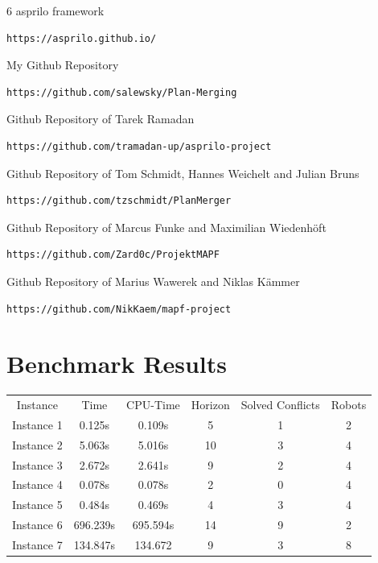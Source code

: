 \documentclass[runningheads]{llncs}
\begin{document}
\begin{thebibliography} {6}
asprilo framework
\begin{verbatim}
https://asprilo.github.io/
\end{verbatim}

My Github Repository
\begin{verbatim}
https://github.com/salewsky/Plan-Merging
\end{verbatim}

Github Repository of Tarek Ramadan
\begin{verbatim}
https://github.com/tramadan-up/asprilo-project
\end{verbatim}

Github Repository of Tom Schmidt, Hannes Weichelt and Julian Bruns
\begin{verbatim}
https://github.com/tzschmidt/PlanMerger
\end{verbatim}

Github Repository of Marcus Funke and Maximilian Wiedenhöft
\begin{verbatim}
https://github.com/Zard0c/ProjektMAPF
\end{verbatim}

Github Repository of Marius Wawerek and Niklas Kämmer
\begin{verbatim}
https://github.com/NikKaem/mapf-project
\end{verbatim}

\end{thebibliography}

\newpage
\appendix
\section{Benchmark Results}
\begin{tabular}[h]{c|c|c|c|c|c}
Instance & Time & CPU-Time & Horizon & Solved Conflicts & Robots \\
Instance 1 & 0.125s & 0.109s & 5 & 1 & 2 \\
Instance 2 & 5.063s & 5.016s & 10 & 3 & 4 \\
Instance 3 & 2.672s & 2.641s & 9 & 2 & 4 \\
Instance 4 & 0.078s & 0.078s & 2 & 0 & 4 \\
Instance 5 & 0.484s & 0.469s & 4 & 3 & 4 \\
Instance 6 & 696.239s & 695.594s & 14 & 9 & 2 \\
Instance 7 & 134.847s & 134.672 & 9 & 3 & 8 \\
\end{tabular}
\end{document}
